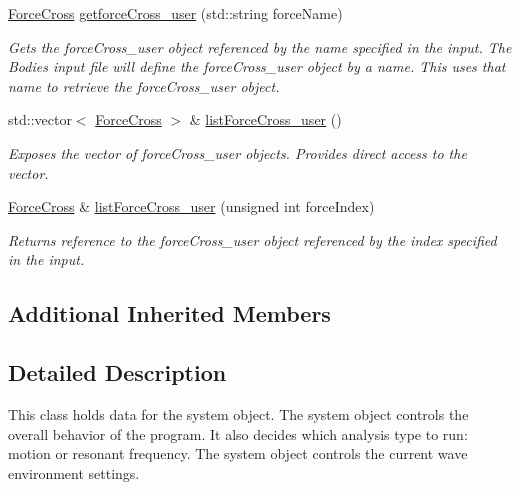 \begin{DoxyCompactItemize}
\hyperlink{classosea_1_1ofreq_1_1_force_cross}{Force\-Cross} \hyperlink{classosea_1_1ofreq_1_1_system_a3ddf9d003e20f670eb25045165d234dc}{getforce\-Cross\-\_\-user} (std\-::string force\-Name)
\begin{DoxyCompactList}\small\item\em Gets the force\-Cross\-\_\-user object referenced by the name specified in the input. The Bodies input file will define the force\-Cross\-\_\-user object by a name. This uses that name to retrieve the force\-Cross\-\_\-user object. \end{DoxyCompactList}\item 
std\-::vector$<$ \hyperlink{classosea_1_1ofreq_1_1_force_cross}{Force\-Cross} $>$ \& \hyperlink{classosea_1_1ofreq_1_1_system_aae7cb5596f9d3a44f0bc6fe58b58410a}{list\-Force\-Cross\-\_\-user} ()
\begin{DoxyCompactList}\small\item\em Exposes the vector of force\-Cross\-\_\-user objects. Provides direct access to the vector. \end{DoxyCompactList}\item 
\hyperlink{classosea_1_1ofreq_1_1_force_cross}{Force\-Cross} \& \hyperlink{classosea_1_1ofreq_1_1_system_adcde247d6fe68ee68a65f1a5f2dc8e13}{list\-Force\-Cross\-\_\-user} (unsigned int force\-Index)
\begin{DoxyCompactList}\small\item\em Returns reference to the force\-Cross\-\_\-user object referenced by the index specified in the input. \end{DoxyCompactList}\end{DoxyCompactItemize}
\subsection*{Additional Inherited Members}


\subsection{Detailed Description}
This class holds data for the system object. The system object controls the overall behavior of the program. It also decides which analysis type to run\-: motion or resonant frequency. The system object controls the current wave environment settings. 

